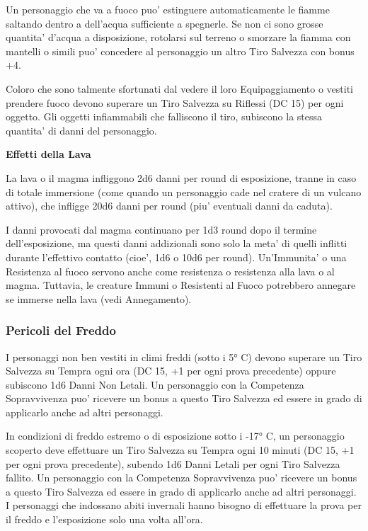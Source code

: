 \documentclass[a4paper,11pt,twoside,openany]{book}
\begin{document}
{		Un personaggio che va a fuoco puo' estinguere automaticamente le fiamme saltando dentro a dell'acqua sufficiente a spegnerle. Se non ci sono grosse quantita' d'acqua a disposizione, rotolarsi sul terreno o smorzare la fiamma con mantelli o simili puo' concedere al personaggio un altro Tiro Salvezza con bonus +4.
		
		Coloro che sono talmente sfortunati dal vedere il loro Equipaggiamento o vestiti prendere fuoco devono superare un Tiro Salvezza su Riflessi (DC 15) per ogni oggetto. Gli oggetti infiammabili che falliscono il tiro, subiscono la stessa quantita' di danni del personaggio.
		
		\medskip
		
		\textbf{Effetti della Lava}
		
		La lava o il magma infliggono 2d6 danni per round di esposizione, tranne in caso di totale immersione (come quando un personaggio cade nel cratere di un vulcano attivo), che infligge 20d6 danni per round (piu' eventuali danni da caduta).
		
		I danni provocati dal magma continuano per 1d3 round dopo il termine dell'esposizione, ma questi danni addizionali sono solo la meta' di quelli inflitti durante l'effettivo contatto (cioe', 1d6 o 10d6 per round). Un'Immunita' o una Resistenza al fuoco servono anche come resistenza o resistenza alla lava o al magma. Tuttavia, le creature Immuni o Resistenti al Fuoco potrebbero annegare se immerse nella lava (vedi Annegamento).
		
		
		\subsubsection{Pericoli del Freddo}
		
		\label{pericoli-del-freddo}
		
		I personaggi non ben vestiti in climi freddi (sotto i 5° C) devono superare un Tiro Salvezza su Tempra ogni ora (DC 15, +1 per ogni prova precedente) oppure subiscono 1d6 Danni Non Letali. Un personaggio con la Competenza Sopravvivenza puo' ricevere un bonus a questo Tiro Salvezza ed essere in grado di applicarlo anche ad altri personaggi.
		
		In condizioni di freddo estremo o di esposizione sotto i -17° C, un personaggio scoperto deve effettuare un Tiro Salvezza su Tempra ogni 10 minuti (DC 15, +1 per ogni prova precedente), subendo 1d6 Danni Letali per ogni Tiro Salvezza fallito. Un personaggio con la Competenza Sopravvivenza puo' ricevere un bonus a questo Tiro Salvezza ed essere in grado di applicarlo anche ad altri personaggi. I personaggi che indossano abiti invernali hanno bisogno di effettuare la prova per il freddo e l'esposizione solo una volta all'ora.
		
}
\end{document}
